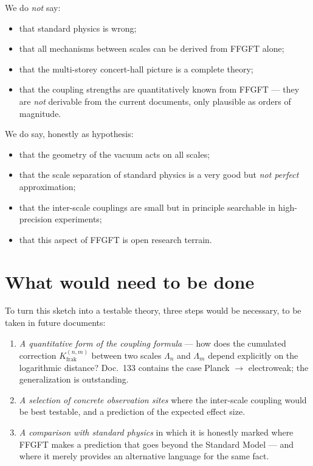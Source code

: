 We do \emph{not} say:

\begin{itemize}\setlength\itemsep{2pt}
  \item that standard physics is wrong;
  \item that all mechanisms between scales can be derived from FFGFT
        alone;
  \item that the multi-storey concert-hall picture is a complete
        theory;
  \item that the coupling strengths are quantitatively known from
        FFGFT --- they are \emph{not} derivable from the current
        documents, only plausible as orders of magnitude.
\end{itemize}

We do say, honestly as hypothesis:

\begin{itemize}\setlength\itemsep{2pt}
  \item that the geometry of the vacuum acts on all scales;
  \item that the scale separation of standard physics is a very good
        but \emph{not perfect} approximation;
  \item that the inter-scale couplings are small but in principle
        searchable in high-precision experiments;
  \item that this aspect of FFGFT is open research terrain.
\end{itemize}

\section{What would need to be done}

To turn this sketch into a testable theory, three steps would be
necessary, to be taken in future documents:

\begin{enumerate}\setlength\itemsep{2pt}
  \item \emph{A quantitative form of the coupling formula} --- how
        does the cumulated correction $K_{\mathrm{frak}}^{(n,m)}$
        between two scales $\Lambda_{n}$ and $\Lambda_{m}$ depend
        explicitly on the logarithmic distance? Doc.~133 contains
        the case Planck $\to$ electroweak; the generalization is
        outstanding.
  \item \emph{A selection of concrete observation sites} where the
        inter-scale coupling would be best testable, and a
        prediction of the expected effect size.
  \item \emph{A comparison with standard physics} in which it is
        honestly marked where FFGFT makes a prediction that goes
        beyond the Standard Model --- and where it merely provides
        an alternative language for the same fact.
\end{enumerate}


